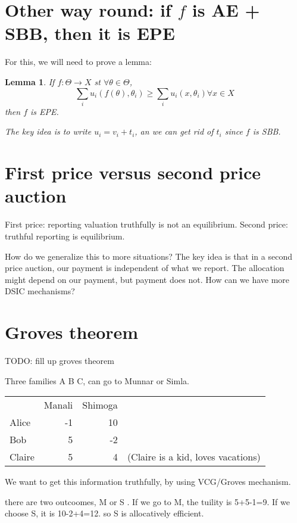 \documentclass[11pt]{book}
\newtheorem{lemma}[corollary]{Lemma}
\begin{document}
\section{Other way round: if $f$ is AE + SBB, then it is EPE}

For this, we will need to prove a lemma:

\begin{lemma}
If $f: \Theta \rightarrow X$ st $\forall \theta \in \Theta$,
$$
\sum_i u_i(f(\theta), \theta_i) \geq \sum_i u_i(x, \theta_i) \forall x \in X
$$
then $f$ is EPE.

The key idea is to write $u_i = v_i + t_i$, an we can get rid of $t_i$ since
$f$ is SBB.
\end{lemma}

\section{First price versus second price auction}
First price: reporting valuation truthfully is not an equilibrium. Second
price: truthful reporting is equilibrium.

How do we generalize this to more situations? The key idea is that in a second
price auction, our payment is independent of what we report. The allocation
might depend on our payment, but payment does not. How can we have more
DSIC mechanisms?

\section{Groves theorem}
TODO: fill up groves theorem



Three families A B C, can go to Munnar or Simla. 


\begin{tabular}{l r r l}
  &  Manali &  Shimoga & \\
Alice & -1 &  10 & \\
Bob & 5  & -2  & \\
Claire & 5  & 4  & (Claire is a kid, loves vacations) \\
\end{tabular}

We want to get this information truthfully, by using VCG/Groves mechanism.

there are two outcoomes, M or S . If we go to M, the tuility is 5+5-1=9. If
we choose S, it is 10-2+4=12. so S is allocatively efficient.
\end{document}
